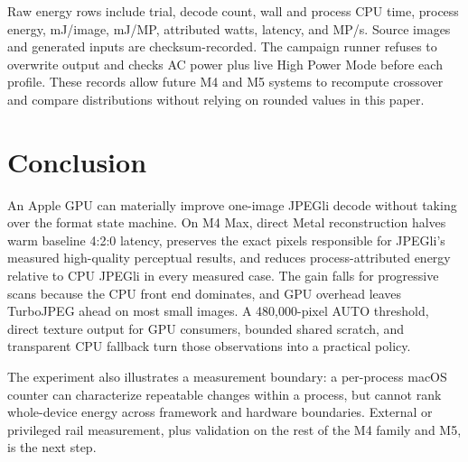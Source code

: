 \documentclass[10pt,twocolumn]{article}
\begin{document}
Raw energy rows include trial, decode count, wall and process CPU time,
process energy, mJ/image, mJ/MP, attributed watts, latency, and MP/s.  Source
images and generated inputs are checksum-recorded.  The campaign runner refuses
to overwrite output and checks AC power plus live High Power Mode before each
profile.  These records allow future M4 and M5 systems to recompute crossover
and compare distributions without relying on rounded values in this paper.

\section{Conclusion}

An Apple GPU can materially improve one-image JPEGli decode without taking
over the format state machine.  On M4 Max, direct Metal reconstruction halves
warm baseline 4:2:0 latency, preserves the exact pixels responsible for
JPEGli's measured high-quality perceptual results, and reduces
process-attributed energy relative to CPU JPEGli in every measured case.  The
gain falls for progressive scans because the CPU front end dominates, and GPU
overhead leaves TurboJPEG ahead on most small images.  A 480,000-pixel AUTO
threshold, direct texture output for GPU consumers, bounded shared scratch,
and transparent CPU fallback turn those observations into a practical policy.

The experiment also illustrates a measurement boundary: a per-process macOS
counter can characterize repeatable changes within a process, but cannot rank
whole-device energy across framework and hardware boundaries.  External or
privileged rail measurement, plus validation on the rest of the M4 family and
M5, is the next step.



\end{document}
